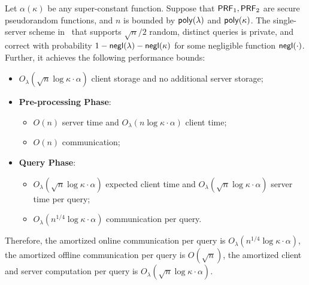 \begin{theorem}
    \label{thm:main-1server} %
    \label{thm:eff1srv}
    Let $\alpha(\kappa)$ be any super-constant function. 
Suppose that $\mathsf{PRF}_1,\mathsf{PRF}_2$ are secure pseudorandom functions, and 
$n$ is bounded by $\mathsf{poly}(\lambda)$ and
    $\mathsf{poly}(\kappa)$. 
The single-server scheme in~ that supports
    $\sqrt{n}/2$ random, distinct queries is private, and correct with probability
    $1-\mathsf{negl}(\lambda)-\mathsf{negl}(\kappa)$ for some negligible function $\mathsf{negl}(\cdot)$.
Further, it achieves the following performance
    bounds:
    \begin{itemize}
        \item $O_\lambda(\sqrt{n}\log \kappa \cdot \alpha)$ client storage and
        no additional server storage;
        \item \textbf{Pre-processing Phase}:
        \begin{itemize}
\item $O(n)$ server time and $O_\lambda(n\log \kappa \cdot \alpha)$ 
client time;
            \item {$O(n)$ communication};
        \end{itemize}
        \item \textbf{Query Phase}:
        \begin{itemize}
            \item $O_\lambda(\sqrt{n}\log \kappa \cdot \alpha)$ expected client
            time and $O_\lambda(\sqrt{n}\log \kappa \cdot \alpha)$ server
            time per query; 
            \item $O_\lambda(n^{1/4}\log \kappa\cdot \alpha)$
            communication per query.
        \end{itemize}
    \end{itemize} 
Therefore, the amortized 
online communication per query is $O_\lambda(n^{1/4} \log \kappa 
\cdot \alpha)$, 
the amortized offline communication per query 
is $O(\sqrt{n})$, the amortized
client and server computation per query is
$O_\lambda(\sqrt{n}\log \kappa \cdot \alpha)$.
\end{theorem}

